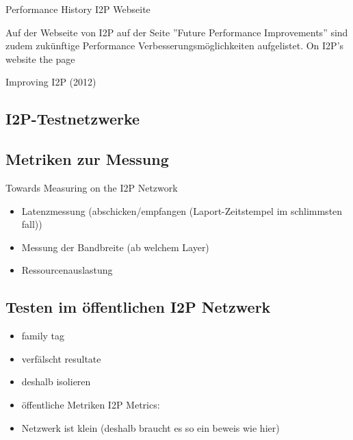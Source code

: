 Performance History I2P Webseite
\cite{noauthor_performance_nodate-1}

Auf der Webseite von I2P auf der Seite ''Future Performance Improvements'' sind zudem zukünftige Performance Verbesserungsmöglichkeiten aufgelistet.
\cite{noauthor_future_nodate}
On I2P's website the page 

Improving I2P (2012)
\cite{timpanaro_improving_2012}


\subsection{I2P-Testnetzwerke}

\subsection{Metriken zur Messung}

Towards Measuring on the I2P Netzwork
\cite{wang_towards_2013}

\begin{itemize}
    \item Latenzmessung (abschicken/empfangen (Laport-Zeitstempel im schlimmsten fall))
    \item Messung der Bandbreite (ab welchem Layer)
    \item Ressourcenauslastung
\end{itemize}

\cite{timpanaro_monitoring_nodate}

\subsection{Testen im öffentlichen I2P Netzwerk}

\begin{itemize}
    \item family tag \cite{noauthor_family_nodate}
    \item verfälscht resultate
    \item deshalb isolieren
    \item öffentliche Metriken  I2P Metrics: \cite{noauthor_i2p_nodate-4}
    \item Netzwerk ist klein (deshalb braucht es so ein beweis wie hier)
\end{itemize}
